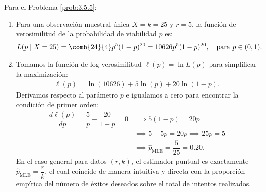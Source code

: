 \begin{solucion}
	\label{sol:3.5.5}
	Para el Problema \ref{prob:3.5.5}:
	\begin{enumerate}
		\item Para una observación muestral única $X = k = 25$ y $r = 5$, la función de verosimilitud de la probabilidad de viabilidad $p$ es:
		\begin{align*}
			L(p \mid X = 25) = \comb{24}{4} p^5 (1-p)^{20} = 10626 p^5 (1-p)^{20}, \quad \text{para } p \in (0, 1).
		\end{align*}
		\item Tomamos la función de log-verosimilitud $\ell(p) = \ln L(p)$ para simplificar la maximización:
		\begin{align*}
			\ell(p) = \ln(10626) + 5 \ln(p) + 20 \ln(1-p).
		\end{align*}
		Derivamos respecto al parámetro $p$ e igualamos a cero para encontrar la condición de primer orden:
		\begin{align*}
			\dfrac{d \ell(p)}{dp} = \dfrac{5}{p} - \dfrac{20}{1-p} = 0 &\implies 5(1-p) = 20p \\
			&\implies 5 - 5p = 20p \implies 25p = 5 \\
			&\implies \hat{p}_{\text{MLE}} = \dfrac{5}{25} = 0.20.
		\end{align*}
		En el caso general para datos $(r, k)$, el estimador puntual es exactamente $\hat{p}_{\text{MLE}} = \dfrac{r}{k}$, el cual coincide de manera intuitiva y directa con la proporción empírica del número de éxitos deseados sobre el total de intentos realizados.
	\end{enumerate}
\end{solucion}

